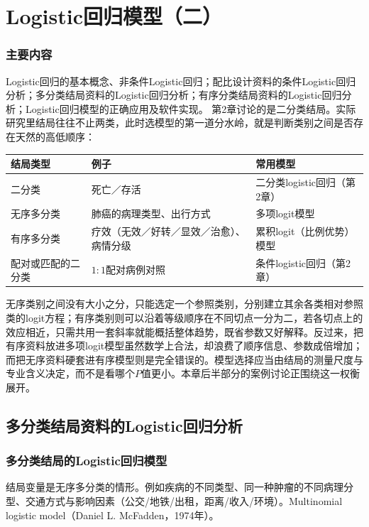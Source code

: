 \chapter{Logistic回归模型（二）}
\subsection*{主要内容}
Logistic回归的基本概念、非条件Logistic回归；配比设计资料的条件Logistic回归分析；多分类结局资料的Logistic回归分析；有序分类结局资料的Logistic回归分析；Logistic回归模型的正确应用及软件实现。
第2章讨论的是二分类结局。实际研究里结局往往不止两类，此时选模型的第一道分水岭，就是判断类别之间是否存在天然的高低顺序：
\begin{center}\small
\begin{tabular}{lll}\toprule
结局类型&例子&常用模型\\\midrule
二分类&死亡／存活&二分类logistic回归（第2章）\\
无序多分类&肺癌的病理类型、出行方式&多项logit模型\\
有序多分类&疗效（无效／好转／显效／治愈）、病情分级&累积logit（比例优势）模型\\
配对或匹配的二分类&$1:1$配对病例对照&条件logistic回归（第2章）\\\bottomrule
\end{tabular}
\end{center}
无序类别之间没有大小之分，只能选定一个参照类别，分别建立其余各类相对参照类的logit方程；有序类别则可以沿着等级顺序在不同切点一分为二，若各切点上的效应相近，只需共用一套斜率就能概括整体趋势，既省参数又好解释。反过来，把有序资料放进多项logit模型虽然数学上合法，却浪费了顺序信息、参数成倍增加；而把无序资料硬套进有序模型则是完全错误的。模型选择应当由结局的测量尺度与专业含义决定，而不是看哪个$P$值更小。本章后半部分的案例讨论正围绕这一权衡展开。
\section{多分类结局资料的Logistic回归分析}
\subsection{多分类结局的Logistic回归模型}
结局变量是无序多分类的情形。例如疾病的不同类型、同一种肿瘤的不同病理分型、交通方式与影响因素（公交/地铁/出租，距离/收入/环境）。Multinomial logistic model（Daniel L. McFadden，1974年）。
